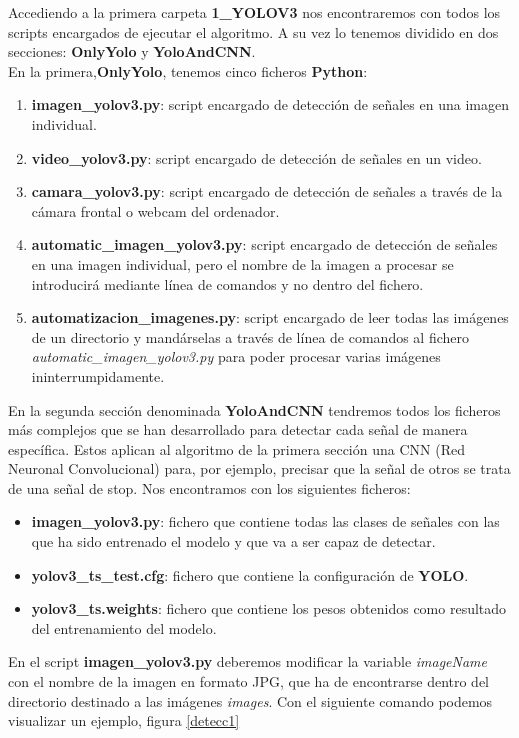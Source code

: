 Accediendo a la primera carpeta \textbf{1_YOLOV3} nos encontraremos con todos los scripts encargados de ejecutar el algoritmo. A su vez lo tenemos dividido en dos secciones: \textbf{OnlyYolo} y \textbf{YoloAndCNN}. \\
En la primera,\textbf{OnlyYolo}, tenemos cinco ficheros \textbf{Python}:

\begin{enumerate}
\item \textbf{imagen_yolov3.py}: script encargado de detección de señales en una imagen individual.
\item \textbf{video_yolov3.py}: script encargado de detección de señales en un video.
\item \textbf{camara_yolov3.py}: script encargado de detección de señales a través de la cámara frontal o webcam del ordenador.
\item \textbf{automatic_imagen_yolov3.py}: script encargado de detección de señales en una imagen individual, pero el nombre de la imagen a procesar se introducirá mediante línea de comandos y no dentro del fichero.
\item \textbf{automatizacion_imagenes.py}: script encargado de leer todas las imágenes de un directorio y mandárselas a través de línea de comandos al fichero \textit{automatic_imagen_yolov3.py} para poder procesar varias imágenes ininterrumpidamente.
\end{enumerate}

En la segunda sección denominada \textbf{YoloAndCNN} tendremos todos los ficheros más complejos que se han desarrollado para detectar cada señal de manera específica. Estos aplican al algoritmo de la primera sección una CNN (Red Neuronal Convolucional) para, por ejemplo, precisar que la señal de otros se trata de una señal de stop. Nos encontramos con los siguientes ficheros:
\begin{itemize}
\item \textbf{imagen_yolov3.py}: fichero que contiene todas las clases de señales con las que ha sido entrenado el modelo y que va a ser capaz de detectar.
\item \textbf{yolov3_ts_test.cfg}: fichero que contiene la configuración de \textbf{YOLO}.
\item \textbf{yolov3_ts.weights}: fichero que contiene los pesos obtenidos como resultado del entrenamiento del modelo.
\end{itemize}

En el script \textbf{imagen_yolov3.py} deberemos modificar la variable \textit{imageName} con el nombre de la imagen en formato JPG, que ha de encontrarse dentro del directorio destinado a las imágenes \textit{images}. Con el siguiente comando podemos visualizar un ejemplo, figura \ref{detecc1} 

